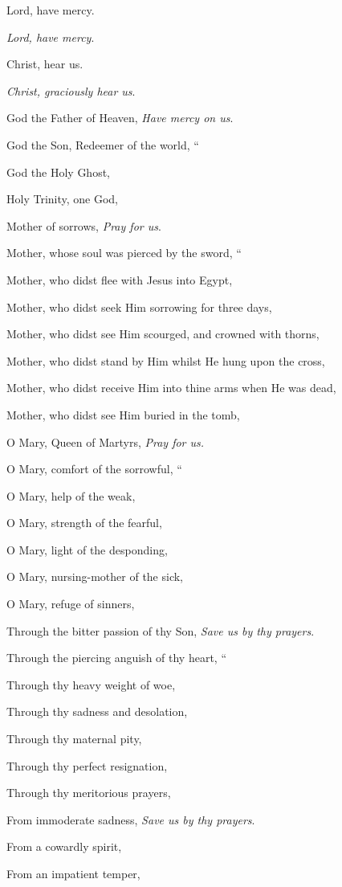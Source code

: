 Lord, have mercy.

\emph{Lord, have mercy}.

Christ, hear us.

\emph{Christ, graciously hear us}.

God the Father of Heaven,
\emph{Have mercy on us}.

God the Son, Redeemer of the world,
``

God the Holy Ghost,

Holy Trinity, one God,

Mother of sorrows,
\emph{Pray for us}.

Mother, whose soul was pierced by the sword,
``

Mother, who didst flee with Jesus into Egypt,

Mother, who didst seek Him sorrowing for three days,

Mother, who didst see Him scourged, and crowned with thorns, 

Mother, who didst stand by Him whilst He hung upon the cross,

Mother, who didst receive Him into thine arms when He was dead,

Mother, who didst see Him buried in the tomb,

O Mary, Queen of Martyrs,
\emph{Pray for us.}

O Mary, comfort of the sorrowful,
``

O Mary, help of the weak,

O Mary, strength of the fearful,

O Mary, light of the desponding,

O Mary, nursing-mother of the sick,

O Mary, refuge of sinners,

Through the bitter passion of
thy Son,
\emph{Save us by thy prayers}.

Through the piercing anguish of thy heart,
``

Through thy heavy weight of woe,

Through thy sadness and desolation,

Through thy maternal pity,

Through thy perfect resignation,

Through thy meritorious prayers,

From immoderate sadness,
\emph{Save us by thy prayers}.

From a cowardly spirit,

From an impatient temper,

